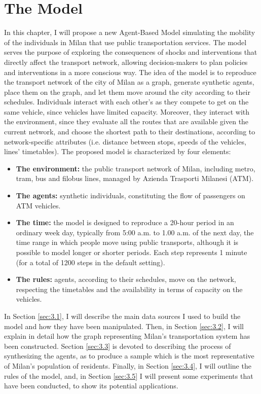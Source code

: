 \chapter{The Model} \label{ch:model}

In this chapter, I will propose a new Agent-Based Model simulating the mobility of the individuals in Milan that use public transportation services. The model serves the purpose of exploring the consequences of shocks and interventions that directly affect the transport network, allowing decision-makers to plan policies and interventions in a more conscious way. The idea of the model is to reproduce the transport network of the city of Milan as a graph, generate synthetic agents, place them on the graph, and let them move around the city according to their schedules. Individuals interact with each other's as they compete to get on the same vehicle, since vehicles have limited capacity. Moreover, they interact with the environment, since they evaluate all the routes that are available given the current network, and choose the shortest path to their destinations, according to network-specific attributes (i.e. distance between stops, speeds of the vehicles, lines' timetables). 
The proposed model is characterized by four elements:
\begin{itemize}
    \item \textbf{The environment:} the public transport network of Milan, including metro, tram, bus and filobus lines, managed by Azienda Trasporti Milanesi (ATM).
    \item \textbf{The agents:} synthetic individuals, constituting the flow of passengers on ATM vehicles.
    \item \textbf{The time:} the model is designed to reproduce a 20-hour period in an ordinary week day, typically from 5:00 a.m. to 1.00 a.m. of the next day, the time range in which people move using public transports, although it is possible to model longer or shorter periods. Each step represents 1 minute (for a total of 1200 steps in the default setting).
    \item \textbf{The rules:} agents, according to their schedules, move on the network, respecting the timetables and the availability in terms of capacity on the vehicles.
\end{itemize}

In Section \ref{sec:3.1}, I will describe the main data sources I used to build the model and how they have been manipulated. Then, in Section \ref{sec:3.2}, I will explain in detail how the graph representing Milan's transportation system has been constructed. Section \ref{sec:3.3} is devoted to describing the process of synthesizing the agents, as to produce a sample which is the most representative of Milan's population of residents. Finally, in Section \ref{sec:3.4}, I will outline the rules of the model, and, in Section \ref{sec:3.5} I will present some experiments that have been conducted, to show its potential applications.

